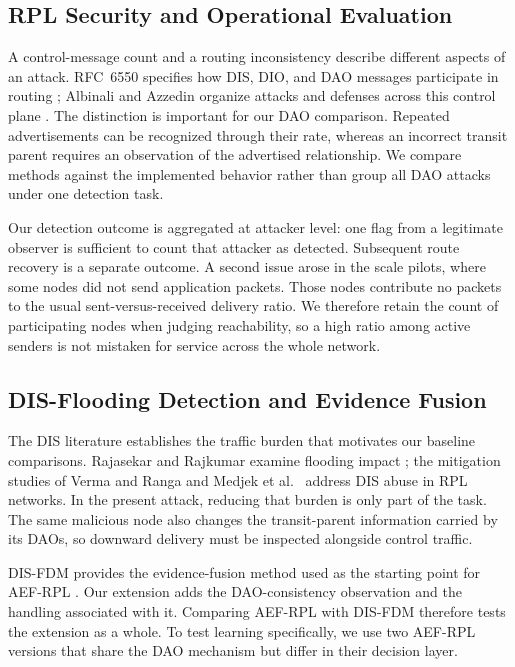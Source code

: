 \subsection{RPL Security and Operational Evaluation}
A control-message count and a routing inconsistency describe different aspects of an attack. RFC~6550 specifies how DIS, DIO, and DAO messages participate in routing \cite{rfc6550}; Albinali and Azzedin organize attacks and defenses across this control plane \cite{albinali2024}. The distinction is important for our DAO comparison. Repeated advertisements can be recognized through their rate, whereas an incorrect transit parent requires an observation of the advertised relationship. We compare methods against the implemented behavior rather than group all DAO attacks under one detection task.

Our detection outcome is aggregated at attacker level: one flag from a legitimate observer is sufficient to count that attacker as detected. Subsequent route recovery is a separate outcome. A second issue arose in the scale pilots, where some nodes did not send application packets. Those nodes contribute no packets to the usual sent-versus-received delivery ratio. We therefore retain the count of participating nodes when judging reachability, so a high ratio among active senders is not mistaken for service across the whole network.

\subsection{DIS-Flooding Detection and Evidence Fusion}
The DIS literature establishes the traffic burden that motivates our baseline comparisons. Rajasekar and Rajkumar examine flooding impact \cite{rajasekar2022}; the mitigation studies of Verma and Ranga \cite{vermaranga2020} and Medjek et al.\ \cite{medjek2021} address DIS abuse in RPL networks. In the present attack, reducing that burden is only part of the task. The same malicious node also changes the transit-parent information carried by its DAOs, so downward delivery must be inspected alongside control traffic.

DIS-FDM provides the evidence-fusion method used as the starting point for AEF-RPL \cite{prajisha2025}. Our extension adds the DAO-consistency observation and the handling associated with it. Comparing AEF-RPL with DIS-FDM therefore tests the extension as a whole. To test learning specifically, we use two AEF-RPL versions that share the DAO mechanism but differ in their decision layer.

